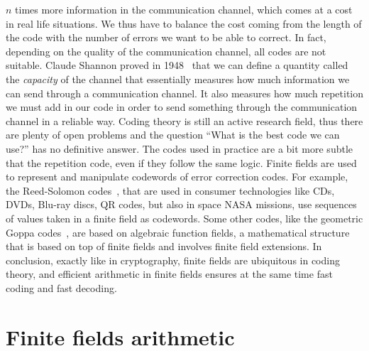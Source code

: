 $n$ times more information in the communication channel, which comes at a cost
in real life situations. We thus have to balance the cost coming from the length
of the code with the number of errors we want to be able to correct. In fact,
depending on the quality of the communication channel, all codes are not
suitable. Claude Shannon proved in
1948~\cite{Shannon48} that we can define a quantity called the \emph{capacity}
of the channel that essentially measures how much information we can send
through a communication channel. It also measures how much repetition we
must add in our code in order to send something through the communication
channel in a reliable way. Coding theory is still an active research field, thus
there are plenty of open problems and the question ``What is the best code we
can use?'' has no definitive answer. The codes used in practice
are a bit more subtle that the repetition code, even if they follow the same
logic. Finite fields are used to represent and manipulate codewords of error
correction codes. For example, the Reed-Solomon codes~\cite{RS60}, that are used
in consumer technologies like CDs, DVDs, Blu-ray discs, QR codes, but also in
space NASA missions, use sequences of values taken in a finite field as
codewords. Some other codes, like the geometric Goppa codes~\cite{Goppa81}, are
based on algebraic function fields, a mathematical structure that is based on
top of finite fields and involves finite field extensions.
In conclusion, exactly like in cryptography, finite fields are
ubiquitous in coding theory, and efficient arithmetic in finite fields ensures
at the same time fast coding and fast decoding.

\section*{Finite fields arithmetic}

